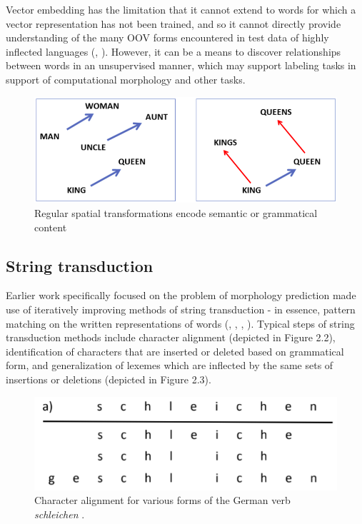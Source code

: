 Vector embedding has the limitation that it cannot extend to words for which a vector representation has not been trained, and so it cannot directly provide understanding of the many OOV forms encountered in test data of highly inflected languages (\cite{Soricut2015}, \cite{Cotterell2019}). However, it can be a means to discover relationships between words in an unsupervised manner, which may support labeling tasks in support of computational morphology and other tasks.

\begin{figure}[ht]
\includegraphics[width=12cm]{images/semantic_transform.png}
\centering
\caption{Regular spatial transformations encode semantic or grammatical content \parencite{Mikolov2013}}
\end{figure}

\subsection{String transduction}

Earlier work specifically focused on the problem of morphology prediction made use of iteratively improving methods of string transduction - in essence, pattern matching on the written representations of words (\cite{Durrett2013}, \cite{Hulden2014}, \cite{Nicolai2015}, \cite{Ahlberg2015}). Typical steps of string transduction methods include character alignment (depicted in Figure 2.2), identification of characters that are inserted or deleted based on grammatical form, and generalization of lexemes which are inflected by the same sets of insertions or deletions (depicted in Figure 2.3). 

\begin{figure}[ht]
\includegraphics[width=12cm]{images/Nicolai2015_schleichen.png}
\centering
\caption{Character alignment for various forms of the German verb \textit{schleichen} \parencite{Nicolai2015}.}
\end{figure}

